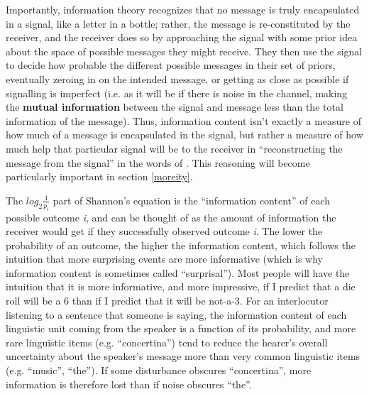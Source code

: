 \documentclass[12pt]{article}
\begin{document}
Importantly, information theory recognizes that no message is truly encapsulated in a signal, like a letter in a bottle; rather, the message is re-constituted by the receiver, and the receiver does so by approaching the signal with some prior idea about the space of possible messages they might receive. They then use the signal to decide how probable the different possible messages in their set of priors, eventually zeroing in on the intended message, or getting as close as possible if signalling is imperfect (i.e. as it will be if there is noise in the channel, making the \textbf{mutual information} between the signal and message less than the total information of the message). Thus, information content isn't exactly a measure of how much of a message is encapsulated in the signal, but rather a measure of how much help that particular signal will be to the receiver in ``reconstructing the message from the signal'' in the words of \citet{shannon1948}. This reasoning will become particularly important in section \ref{moreity}.

The $log_2 \frac{1}{p_i}$ part of Shannon's equation is the ``information content'' of each possible outcome \textsl{i}, and can be thought of as the amount of information the receiver would get if they successfully observed outcome \textsl{i}. The lower the probability of an outcome, the higher the information content, which follows the intuition that more surprising events are more informative (which is why information content is sometimes called ``surprisal''). Most people will have the intuition that it is more informative, and more impressive, if I predict that a die roll will be a 6 than if I predict that it will be not-a-3. For an interlocutor listening to a sentence that someone is saying, the information content of each linguistic unit coming from the speaker is a function of its probability, and more rare linguistic items (e.g. ``concertina'') tend to reduce the hearer's overall uncertainty about the speaker's message more than very common linguistic items (e.g. ``music'', ``the''). If some disturbance obscures ``concertina'', more information is therefore lost than if noise obscures ``the''.
\end{document}
